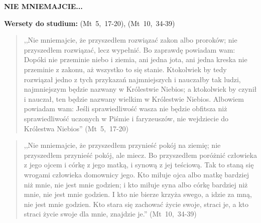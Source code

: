 \documentclass[10pt,a4paper,oneside]{article}
\begin{document}
\centerline{\textbf{\MakeUppercase{Nie mniemajcie...}}}
\begin{center}
\textbf{Wersety do studium:} (Mt~5,~17-20), (Mt~10,~34-39)
\end{center}
\begin{quote}
,,Nie mniemajcie, że przyszedłem rozwiązać zakon albo proroków; nie przyszedłem rozwiązać, lecz wypełnić. Bo zaprawdę powiadam wam: Dopóki nie przeminie niebo i ziemia, ani jedna jota, ani jedna kreska nie przeminie z zakonu, aż wszystko to się stanie. Ktokolwiek by tedy rozwiązał jedno z tych przykazań najmniejszych i nauczałby tak ludzi, najmniejszym będzie nazwany w Królestwie Niebios; a ktokolwiek by czynił i nauczał, ten będzie nazwany wielkim w Królestwie Niebios. Albowiem powiadam wam: Jeśli sprawiedliwość wasza nie będzie obfitsza niż sprawiedliwość uczonych w Piśmie i faryzeuszów, nie wejdziecie do Królestwa Niebios'' (Mt~5,~17-20)
\end{quote}
\begin{quote}
,,Nie mniemajcie, że przyszedłem przynieść pokój na ziemię; nie przyszedłem przynieść pokój, ale miecz. Bo przyszedłem poróżnić człowieka z jego ojcem i córkę z jego matką, i synową z jej teściową. Tak to staną się wrogami człowieka domownicy jego. Kto miłuje ojca albo matkę bardziej niż mnie, nie jest mnie godzien; i kto miłuje syna albo córkę bardziej niż mnie, nie jest mnie godzien. I kto nie bierze krzyża swego, a idzie za mną, nie jest mnie godzien. Kto stara się zachować życie swoje, straci je, a kto straci życie swoje dla mnie, znajdzie je.'' (Mt~10,~34-39)
\end{quote}
\end{document}
